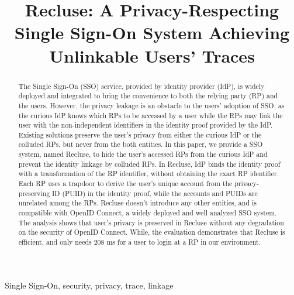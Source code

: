 \documentclass[conference, 10pt]{IEEEtran}
\begin{document}
\title{{Recluse}: A Privacy-Respecting Single Sign-On System Achieving Unlinkable Users' Traces}
%
\maketitle
\begin{abstract}
 The Single Sign-On (SSO) service, provided by identity provider (IdP),  is widely deployed and integrated to bring the convenience to both the relying party (RP) and the users.
 However, the privacy leakage is an obstacle to the users' adoption of SSO, as the curious IdP knows which RPs to be accessed by a user  
 while the RPs may link the user with the non-independent identifiers in the identity proof provided by the IdP.
 Existing solutions preserve the user's privacy  from either the curious IdP or the colluded RPs, but never from the both entities. 
In this paper, we provide a SSO system, named Recluse, to hide the user's accessed RPs from the curious IdP 
and prevent the identity linkage by colluded RPs. 
In Recluse, IdP binds the identity proof with a transformation of the RP identifier, without obtaining the exact RP identifier.
Each RP uses a trapdoor to derive the user's unique account from the  privacy-preserving ID (PUID) in the identity proof, 
while the accounts and PUIDs are unrelated among the RPs.
Recluse doesn't introduce any other entities, and  is compatible with OpenID Connect, a widely deployed and well analyzed SSO system. 
The analysis shows that user's privacy is preserved in Recluse without any degradation on the security of OpenID Connect.
While, the evaluation demonstrates that Recluse is efficient, and only needs 208 ms for a user to login at a RP in our environment.
\end{abstract}
\begin{IEEEkeywords}
Single Sign-On, security, privacy, trace, linkage
\end{IEEEkeywords}















\end{document}
